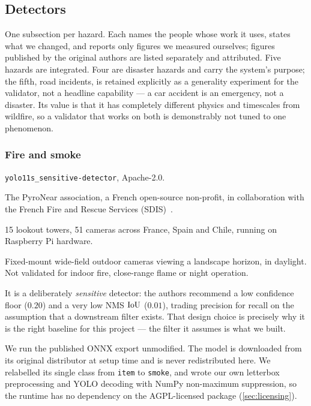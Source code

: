 \subsection{Detectors}
\label{sec:detectors}

One subsection per hazard. Each names the people whose work it uses, states
what we changed, and reports only figures we measured ourselves; figures
published by the original authors are listed separately and attributed.
Five hazards are integrated. Four are disaster hazards and carry the system's
purpose; the fifth, road incidents, is retained explicitly as a generality
experiment for the validator, not a headline capability — a car
accident is an emergency, not a disaster. Its value is that it has completely
different physics and timescales from wildfire, so a validator that works on
both is demonstrably not tuned to one phenomenon.

\subsubsection{Fire and smoke}
\label{sec:fire}

\begin{description}[leftmargin=7.4em,labelwidth=7.0em,style=sameline,font=\normalfont\itshape]
  \item[Model] \texttt{yolo11s\_sensitive-detector}, Apache-2.0.
  \item[Authors] The PyroNear association, a French open-source non-profit, in
    collaboration with the French Fire and Rescue Services
    (SDIS)~\citep{pyronear2025}.
  \item[Deployment] 15 lookout towers, 51 cameras across France, Spain and
    Chile, running on Raspberry Pi hardware.
  \item[Envelope] Fixed-mount wide-field outdoor cameras viewing a landscape
    horizon, in daylight. Not validated for indoor fire, close-range flame or
    night operation.
\end{description}

It is a deliberately \emph{sensitive} detector: the authors recommend a low
confidence floor ($0.20$) and a very low NMS $\operatorname{IoU}$ ($0.01$), trading
precision for recall on the assumption that a downstream filter exists. That
design choice is precisely why it is the right baseline for this project — the
filter it assumes is what we built.

We run the published ONNX export unmodified. The model is downloaded from its
original distributor at setup time and is never redistributed here. We
relabelled its single class from \texttt{item} to \texttt{smoke}, and wrote
our own letterbox preprocessing and YOLO decoding with NumPy non-maximum
suppression, so the runtime has no dependency on the AGPL-licensed package
(\cref{sec:licensing}).


